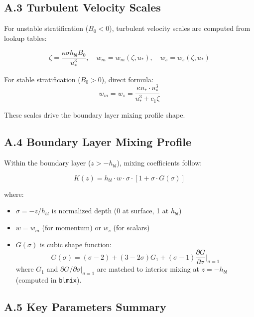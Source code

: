\documentclass[11pt, a4paper]{article}
\begin{document}
\subsection*{A.3 Turbulent Velocity Scales}

For unstable stratification ($B_0 < 0$), turbulent velocity scales are computed from lookup tables:

\begin{equation}
\zeta = \frac{\kappa \sigma h_{bl} B_0}{u_*^3}, \quad w_m = w_m(\zeta, u_*), \quad w_s = w_s(\zeta, u_*)
\end{equation}

For stable stratification ($B_0 > 0$), direct formula:
\begin{equation}
w_m = w_s = \frac{\kappa u_* \cdot u_*^3}{u_*^3 + c_1 \zeta}
\end{equation}

These scales drive the boundary layer mixing profile shape.

\subsection*{A.4 Boundary Layer Mixing Profile}

Within the boundary layer ($z > -h_{bl}$), mixing coefficients follow:

\begin{equation}
K(z) = h_{bl} \cdot w \cdot \sigma \cdot [1 + \sigma \cdot G(\sigma)]
\end{equation}

where:
\begin{itemize}
    \item $\sigma = -z/h_{bl}$ is normalized depth (0 at surface, 1 at $h_{bl}$)
    \item $w = w_m$ (for momentum) or $w_s$ (for scalars)
    \item $G(\sigma)$ is cubic shape function:
    \begin{equation}
    G(\sigma) = (\sigma - 2) + (3 - 2\sigma) G_1 + (\sigma - 1) \frac{\partial G}{\partial \sigma}\bigg|_{\sigma=1}
    \end{equation}
    where $G_1$ and $\partial G/\partial \sigma|_{\sigma=1}$ are matched to interior mixing at $z = -h_{bl}$ (computed in \texttt{blmix}).
\end{itemize}

\subsection*{A.5 Key Parameters Summary}
\end{document}
